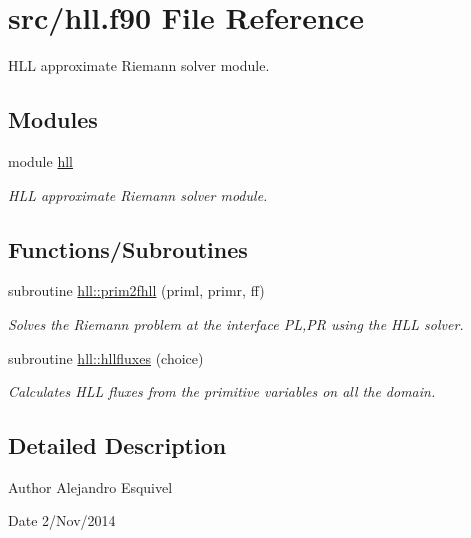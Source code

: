\hypertarget{hll_8f90}{}\section{src/hll.f90 File Reference}
\label{hll_8f90}


H\+L\+L approximate Riemann solver module.  


\subsection*{Modules}
\begin{DoxyCompactItemize}
\item 
module \hyperlink{namespacehll}{hll}
\begin{DoxyCompactList}\small\item\em H\+L\+L approximate Riemann solver module. \end{DoxyCompactList}\end{DoxyCompactItemize}
\subsection*{Functions/\+Subroutines}
\begin{DoxyCompactItemize}
\item 
subroutine \hyperlink{namespacehll_aa67c7db7e17f7dedf7286320baeda1dd}{hll\+::prim2fhll} (priml, primr, ff)
\begin{DoxyCompactList}\small\item\em Solves the Riemann problem at the interface P\+L,P\+R using the H\+L\+L solver. \end{DoxyCompactList}\item 
subroutine \hyperlink{namespacehll_a27386fb5bcf705be5e8c2650484966c6}{hll\+::hllfluxes} (choice)
\begin{DoxyCompactList}\small\item\em Calculates H\+L\+L fluxes from the primitive variables on all the domain. \end{DoxyCompactList}\end{DoxyCompactItemize}


\subsection{Detailed Description}
\begin{DoxyAuthor}{Author}
Alejandro Esquivel 
\end{DoxyAuthor}
\begin{DoxyDate}{Date}
2/\+Nov/2014 
\end{DoxyDate}
